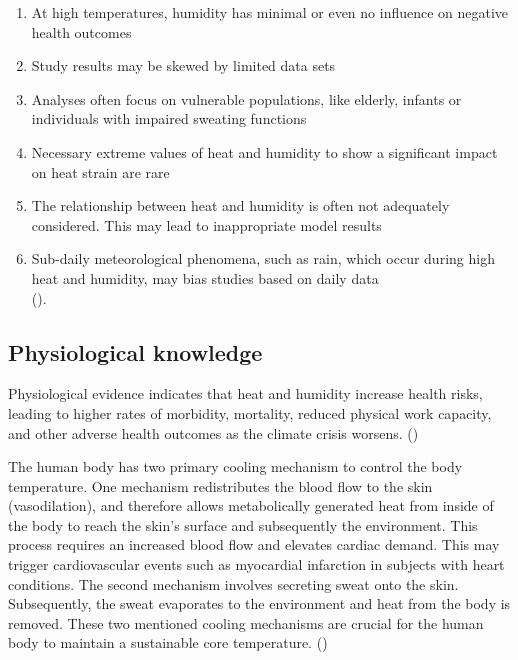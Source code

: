 \documentclass[
]{krantz}
\providecommand{\tightlist}{%
  \setlength{\itemsep}{0pt}\setlength{\parskip}{0pt}}
\begin{document}
\begin{enumerate}
\def\labelenumi{\arabic{enumi})}
\tightlist
\item
  At high temperatures, humidity has minimal or even no influence on negative health outcomes\\
\item
  Study results may be skewed by limited data sets\\
\item
  Analyses often focus on vulnerable populations, like elderly, infants or individuals with impaired sweating functions\\
\item
  Necessary extreme values of heat and humidity to show a significant impact on heat strain are rare\\
\item
  The relationship between heat and humidity is often not adequately considered. This may lead to inappropriate model results\\
\item
  Sub-daily meteorological phenomena, such as rain, which occur during high heat and humidity, may bias studies based on daily data\\
  (\citet{baldwin2023}).
\end{enumerate}

\subsection{Physiological knowledge}\label{physiological-knowledge}

Physiological evidence indicates that heat and humidity increase health risks, leading to higher rates of morbidity, mortality, reduced physical work capacity, and other adverse health outcomes as the climate crisis worsens. (\citet{buzan2020})

The human body has two primary cooling mechanism to control the body temperature. One mechanism redistributes the blood flow to the skin (vasodilation), and therefore allows metabolically generated heat from inside of the body to reach the skin's surface and subsequently the environment. This process requires an increased blood flow and elevates cardiac demand. This may trigger cardiovascular events such as myocardial infarction in subjects with heart conditions.
The second mechanism involves secreting sweat onto the skin. Subsequently, the sweat evaporates to the environment and heat from the body is removed. These two mentioned cooling mechanisms are crucial for the human body to maintain a sustainable core temperature. (\citet{ebi2021})
\end{document}
